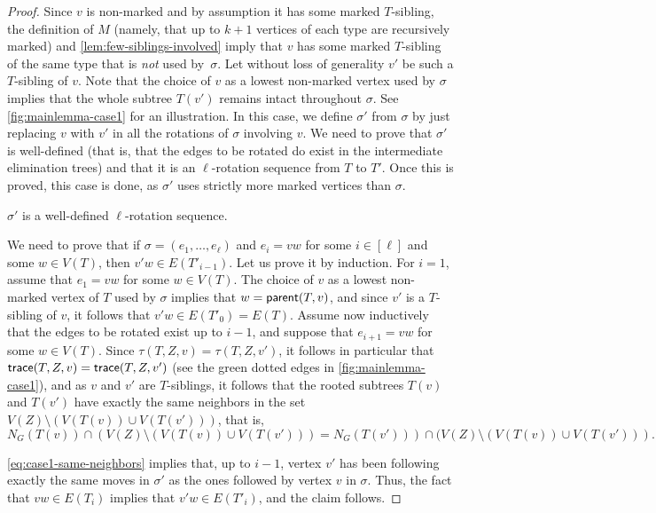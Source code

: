 \documentclass[a4paper,UKenglish,cleveref, autoref, thm-restate]{lipics-v2021}
\newenvironment{cproof}{\proof[Proof of claim]\renewcommand\qedsymbol{$\diamond$}}{\endproof}
\newcommand{\parent}{{\sf parent}\xspace}
\newcommand{\trace}{{\sf trace}\xspace}
\begin{document}
\begin{proof}
Since $v$ is non-marked and by assumption it has some marked $T$-sibling, the definition of $M$ (namely, that up to $k+1$ vertices of each type are recursively marked) and \autoref{lem:few-siblings-involved} imply that $v$ has some marked $T$-sibling of the same type that is {\sl not} used by~$\sigma$. Let without loss of generality $v'$ be such a $T$-sibling of $v$. Note that the choice of $v$ as a lowest non-marked vertex used by $\sigma$ implies that the whole subtree $T(v')$ remains intact throughout $\sigma$. See \autoref{fig:mainlemma-case1} for an illustration. In this case, we define $\sigma'$ from $\sigma$ by just replacing $v$ with $v'$ in all the rotations of $\sigma$ involving $v$. We need to prove that $\sigma'$ is well-defined (that is, that the edges to be rotated do exist in the intermediate elimination trees) and that it is an $\ell$-rotation sequence from $T$ to $T'$. Once this is proved, this case is done, as $\sigma'$ uses strictly more marked vertices than $\sigma$.

\begin{claim}\label{claim:case1-well-defined}
$\sigma'$ is a well-defined $\ell$-rotation sequence.
\end{claim}
\begin{cproof}
We need to prove that if $\sigma=(e_1,\ldots,e_{\ell})$ and $e_i=vw$ for some $i \in [\ell]$ and some $w \in V(T)$, then $v'w \in E(T'_{i-1})$.
Let us prove it by induction. For $i=1$, assume that $e_1=vw$ for some $w \in V(T)$. The choice of $v$ as a lowest non-marked vertex of $T$ used by $\sigma$ implies that $w = \parent(T,v)$, and since $v'$ is a $T$-sibling of $v$, it follows that $v'w \in E(T'_{0})=E(T)$.
Assume now inductively that the edges to be rotated exist up to $i-1$,
and suppose that $e_{i+1}=vw$ for some $w \in V(T)$. Since $\tau(T,Z,v)=\tau(T,Z,v')$, it follows in particular that $\trace(T,Z,v)=\trace(T,Z,v')$ (see the green dotted edges in \autoref{fig:mainlemma-case1}), and as $v$ and $v'$ are $T$-siblings, it follows that the rooted subtrees $T(v)$ and $T(v')$ have exactly the same neighbors in the set $V(Z) \setminus (V(T(v)) \cup V(T(v')))$, that is,
  \begin{equation}\label{eq:case1-same-neighbors}
    N_G(T(v)) \cap  (V(Z) \setminus (V(T(v)) \cup V(T(v')))= N_G(T(v'))) \cap  (V(Z) \setminus (V(T(v)) \cup V(T(v'))).
  \end{equation}

\autoref{eq:case1-same-neighbors} implies that, up to $i-1$, vertex $v'$ has been following exactly the same moves in $\sigma'$ as the ones followed by vertex $v$ in $\sigma$. Thus, the fact that $vw \in E(T_i)$ implies that $v'w \in E(T'_i)$, and the claim follows.
\end{cproof}



\end{proof}
\end{document}
